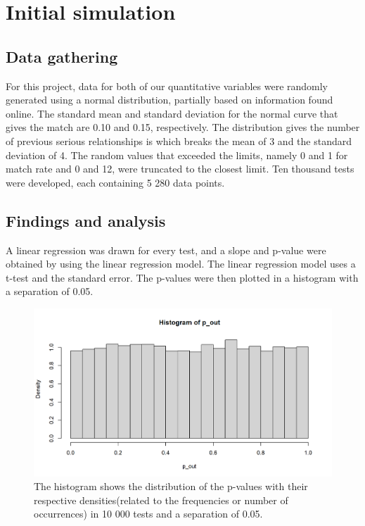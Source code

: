 \documentclass[12pt]{article}
\begin{document}
\section{Initial simulation}
\subsection{Data gathering}
    For this project, data for both of our quantitative variables were randomly generated using a normal distribution, partially based on information found online. The standard mean and standard deviation for the normal curve that gives the match are 0.10\cite{elad2024} and 0.15, respectively. The distribution gives the number of previous serious relationships is which breaks the mean of 3 and the standard deviation of 4. The random values that exceeded the limits, namely 0 and 1 for match rate and 0 and 12, were truncated to the closest limit. Ten thousand tests were developed, each containing 5 280 data points. 

\subsection{Findings and analysis}
    A linear regression was drawn for every test, and a slope and p-value were obtained by using the linear regression model. The linear regression model uses a t-test and the standard error. The p-values were then plotted in a histogram with a separation of 0.05.

    \begin{figure}[H]
        \centering
        \includegraphics[width=0.8\linewidth]{figures/R_plotB.png}
        \caption{The histogram shows the distribution of the p-values with their respective densities(related to the frequencies or number of occurrences) in 10 000 tests and a separation of 0.05.}
        \label{fig:enter-label}
    \end{figure}
\end{document}
